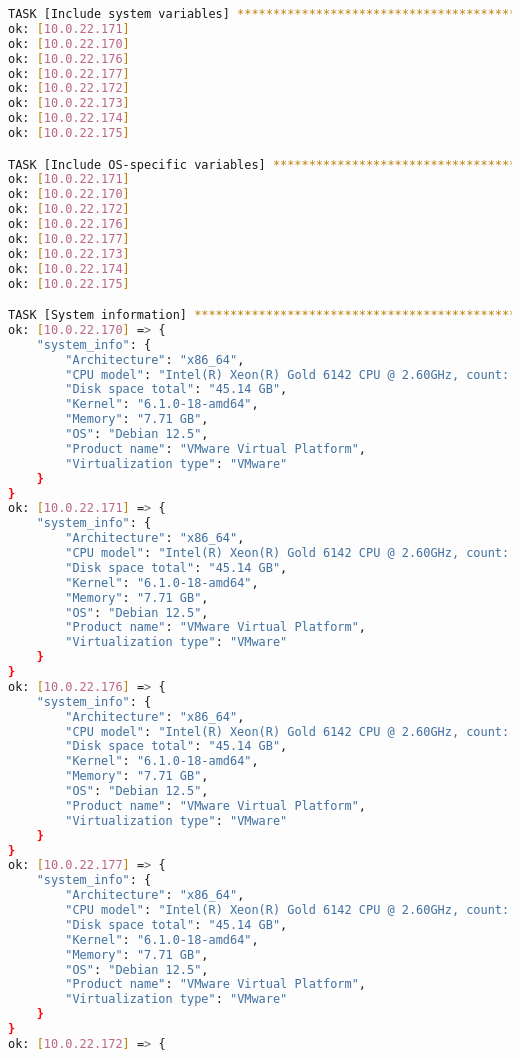 \begin{flushleft}
\begin{lstlisting}[language=bash, caption=Deploy - Anhang - Deployt,captionpos=b,label={lst:deploy-appendix-deployt},breaklines=true]
TASK [Include system variables] ***********************************************************************************************************************************************************************************
ok: [10.0.22.171]
ok: [10.0.22.170]
ok: [10.0.22.176]
ok: [10.0.22.177]
ok: [10.0.22.172]
ok: [10.0.22.173]
ok: [10.0.22.174]
ok: [10.0.22.175]

TASK [Include OS-specific variables] ******************************************************************************************************************************************************************************
ok: [10.0.22.171]
ok: [10.0.22.170]
ok: [10.0.22.172]
ok: [10.0.22.176]
ok: [10.0.22.177]
ok: [10.0.22.173]
ok: [10.0.22.174]
ok: [10.0.22.175]

TASK [System information] *****************************************************************************************************************************************************************************************
ok: [10.0.22.170] => {
    "system_info": {
        "Architecture": "x86_64",
        "CPU model": "Intel(R) Xeon(R) Gold 6142 CPU @ 2.60GHz, count: 4, cores: 1",
        "Disk space total": "45.14 GB",
        "Kernel": "6.1.0-18-amd64",
        "Memory": "7.71 GB",
        "OS": "Debian 12.5",
        "Product name": "VMware Virtual Platform",
        "Virtualization type": "VMware"
    }
}
ok: [10.0.22.171] => {
    "system_info": {
        "Architecture": "x86_64",
        "CPU model": "Intel(R) Xeon(R) Gold 6142 CPU @ 2.60GHz, count: 4, cores: 1",
        "Disk space total": "45.14 GB",
        "Kernel": "6.1.0-18-amd64",
        "Memory": "7.71 GB",
        "OS": "Debian 12.5",
        "Product name": "VMware Virtual Platform",
        "Virtualization type": "VMware"
    }
}
ok: [10.0.22.176] => {
    "system_info": {
        "Architecture": "x86_64",
        "CPU model": "Intel(R) Xeon(R) Gold 6142 CPU @ 2.60GHz, count: 4, cores: 1",
        "Disk space total": "45.14 GB",
        "Kernel": "6.1.0-18-amd64",
        "Memory": "7.71 GB",
        "OS": "Debian 12.5",
        "Product name": "VMware Virtual Platform",
        "Virtualization type": "VMware"
    }
}
ok: [10.0.22.177] => {
    "system_info": {
        "Architecture": "x86_64",
        "CPU model": "Intel(R) Xeon(R) Gold 6142 CPU @ 2.60GHz, count: 4, cores: 1",
        "Disk space total": "45.14 GB",
        "Kernel": "6.1.0-18-amd64",
        "Memory": "7.71 GB",
        "OS": "Debian 12.5",
        "Product name": "VMware Virtual Platform",
        "Virtualization type": "VMware"
    }
}
ok: [10.0.22.172] => {

\end{lstlisting}
\end{flushleft}

